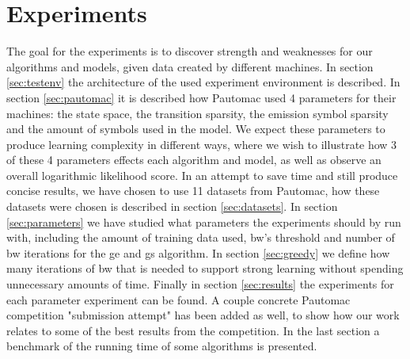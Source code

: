 \chapter{Experiments}
\label{chap:experiments}
The goal for the experiments is to discover strength and weaknesses for our algorithms and models, given data created by different machines. In section \ref{sec:testenv} the architecture of the used experiment environment is described. In section \ref{sec:pautomac} it is described how Pautomac used 4 parameters for their machines: the state space, the transition sparsity, the emission symbol sparsity and the amount of symbols used in the model. We expect these parameters to produce learning complexity in different ways, where we wish to illustrate how 3 of these 4 parameters effects each algorithm and model, as well as observe an overall logarithmic likelihood score. In an attempt to save time and still produce concise results, we have chosen to use 11 datasets from Pautomac, how these datasets were chosen is described in section \ref{sec:datasets}. In section \ref{sec:parameters} we have studied what parameters the experiments should by run with, including the amount of training data used, \gls{bw}'s threshold and number of \gls{bw} iterations for the \gls{ge} and \gls{gs} algorithm. In section \ref{sec:greedy} we define how many iterations of \gls{bw} that is needed to support strong learning without spending unnecessary amounts of time.
Finally in section \ref{sec:results} the experiments for each parameter experiment can be found. A couple concrete Pautomac competition "submission attempt" has been added as well, to show how our work relates to some of the best results from the competition. In the last section a benchmark of the running time of some algorithms is presented.

%



\FloatBarrier

